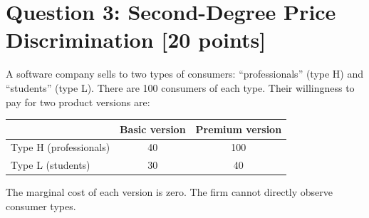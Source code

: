 \documentclass[11pt]{article}
\begin{document}
\section*{Question 3: Second-Degree Price Discrimination [20 points]}

A software company sells to two types of consumers: ``professionals'' (type H) and ``students'' (type L). There are 100 consumers of each type. Their willingness to pay for two product versions are:

\begin{center}
\begin{tabular}{lcc}
\hline
 & Basic version & Premium version \\
\hline
Type H (professionals) & 40 & 100 \\
Type L (students) & 30 & 40 \\
\hline
\end{tabular}
\end{center}

The marginal cost of each version is zero. The firm cannot directly observe consumer types.
\end{document}
